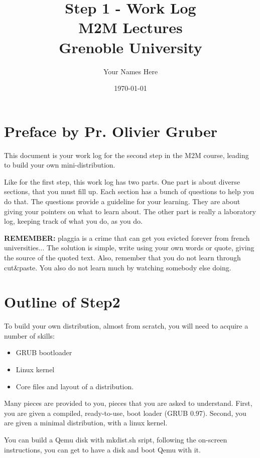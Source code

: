 \documentclass[10]{article}
\begin{document}
\title{Step 1 - Work Log \\
M2M Lectures\\
Grenoble University}
\author{Your Names Here}
\date{\today}
\maketitle

\section{Preface by Pr. Olivier Gruber}

This document is your work log for the second step in the 
M2M course, leading to build your own mini-distribution.

Like for the first step, this work log has two parts. 
One part is about diverse sections, that you must fill up.
Each section has a bunch of questions to help you do that.
The questions provide a guideline for your learning. 
They are about giving your pointers on what to learn about.
The other part is really a laboratory log, 
keeping track of what you do, as you do.

{\bf REMEMBER:} plaggia is a crime that can get you evicted
forever from french universities... The solution is simple,
write using your own words or quote, giving the source of
the quoted text. Also, remember that you do not learn through
cut\&paste. You also do not learn much by watching somebody else
doing.

\section{Outline of Step2}

To build your own distribution, almost from scratch, you will need
to acquire a number of skills:

\begin{itemize}
\item
GRUB bootloader
\item
Linux kernel
\item
Core files and layout of a distribution.
\end{itemize}

Many pieces are provided to you, pieces that you are asked to understand.
First, you are given a compiled, ready-to-use, boot loader (GRUB 0.97).
Second, you are given a minimal distribution, with a linux kernel.

You can build a Qemu disk with mkdist.sh sript, following the on-screen
instructions, you can get to have a disk and boot Qemu with it.
\end{document}
